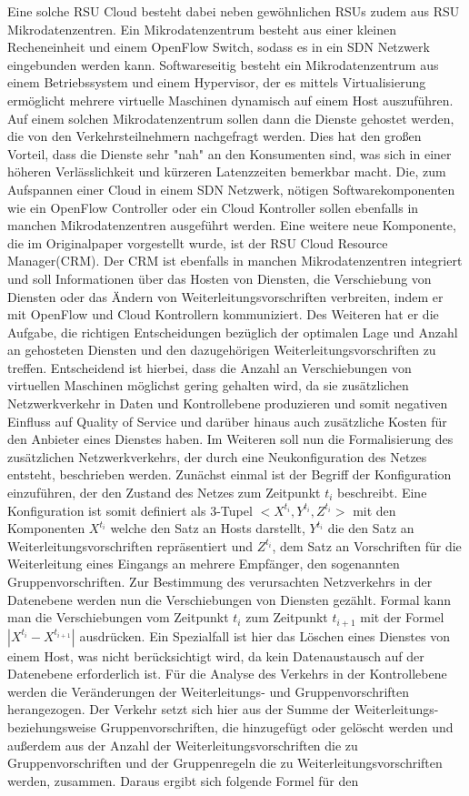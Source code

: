 \documentclass[conference]{IEEEtran}
\begin{document}
Eine solche RSU Cloud besteht dabei neben gewöhnlichen RSUs zudem aus RSU Mikrodatenzentren. Ein Mikrodatenzentrum besteht aus einer kleinen Recheneinheit und einem OpenFlow Switch, sodass es in ein SDN Netzwerk eingebunden werden kann. Softwareseitig besteht ein Mikrodatenzentrum aus einem Betriebssystem und einem Hypervisor, der es mittels Virtualisierung ermöglicht mehrere virtuelle Maschinen dynamisch auf einem Host auszuführen. Auf einem solchen Mikrodatenzentrum sollen dann die Dienste gehostet werden, die von den Verkehrsteilnehmern nachgefragt werden. Dies hat den großen Vorteil, dass die Dienste sehr "nah" an den Konsumenten sind, was sich in einer höheren Verlässlichkeit und kürzeren Latenzzeiten bemerkbar macht. Die, zum Aufspannen einer Cloud in einem SDN Netzwerk, nötigen Softwarekomponenten wie ein OpenFlow Controller oder ein Cloud Kontroller sollen ebenfalls in manchen Mikrodatenzentren ausgeführt werden. Eine weitere neue Komponente, die im Originalpaper vorgestellt wurde, ist der RSU Cloud Resource Manager(CRM). Der CRM ist ebenfalls in manchen Mikrodatenzentren integriert und soll Informationen über das Hosten von Diensten, die Verschiebung von Diensten oder das Ändern von Weiterleitungsvorschriften verbreiten, indem er mit OpenFlow und Cloud Kontrollern kommuniziert. Des Weiteren hat er die Aufgabe, die richtigen Entscheidungen bezüglich der optimalen Lage und Anzahl an gehosteten Diensten und den dazugehörigen Weiterleitungsvorschriften zu treffen. Entscheidend ist hierbei, dass die Anzahl an Verschiebungen von virtuellen Maschinen möglichst gering gehalten wird, da sie zusätzlichen Netzwerkverkehr in Daten und Kontrollebene produzieren und somit negativen Einfluss auf Quality of Service und darüber hinaus auch zusätzliche Kosten für den Anbieter eines Dienstes haben. Im Weiteren soll nun die Formalisierung des zusätzlichen Netzwerkverkehrs, der durch eine Neukonfiguration des Netzes entsteht, beschrieben werden. Zunächst einmal ist der Begriff der Konfiguration einzuführen, der den Zustand des Netzes zum Zeitpunkt \(t_i\) beschreibt. Eine Konfiguration ist somit definiert als 3-Tupel \(<X^{t_i},Y^{t_i},Z^{t_i}>\) mit den Komponenten $X^{t_i}$  welche den Satz an Hosts darstellt, \(Y^{t_i}\)  die den Satz an Weiterleitungsvorschriften repräsentiert und \(Z^{t_i}\),  dem Satz an Vorschriften für die Weiterleitung eines Eingangs an mehrere Empfänger, den sogenannten Gruppenvorschriften. Zur Bestimmung des verursachten Netzverkehrs in der Datenebene werden nun die Verschiebungen von Diensten gezählt. Formal kann man die Verschiebungen vom Zeitpunkt \(t_i\) zum Zeitpunkt \(t_{i+1}\) mit der Formel \(|X^{t_i}-X^{t_{i+1}}|\) ausdrücken. Ein Spezialfall ist hier das Löschen eines Dienstes von einem Host, was nicht berücksichtigt wird, da kein Datenaustausch auf der Datenebene erforderlich ist. Für die Analyse des Verkehrs in der Kontrollebene werden die Veränderungen der Weiterleitungs- und Gruppenvorschriften herangezogen. Der Verkehr setzt sich hier aus der Summe der Weiterleitungs-beziehungsweise Gruppenvorschriften, die hinzugefügt oder gelöscht werden und außerdem aus der Anzahl der Weiterleitungsvorschriften die zu Gruppenvorschriften und der Gruppenregeln die zu Weiterleitungsvorschriften werden, zusammen. Daraus ergibt sich folgende Formel für den 
\end{document}
